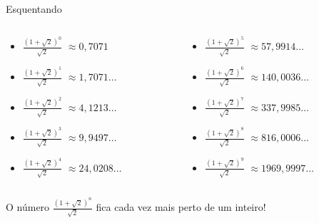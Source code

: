 \documentclass[aspectratio=169, handout]{beamer}
\begin{document}
\begin{frame}{Esquentando}{}
	\begin{columns}
		\begin{column}{5cm}
			\begin{itemize}
				\item $\frac{\left(1+\sqrt{2}\right)^0}{\sqrt{2}}$ \pause $\approx  0{,}7071$
				\item $\frac{\left(1+\sqrt{2}\right)^1}{\sqrt{2}}$ \pause $\approx  1{,}7071\dots$
				\item $\frac{\left(1+\sqrt{2}\right)^2}{\sqrt{2}}$ \pause $\approx  4{,}1213\dots$
				\item $\frac{\left(1+\sqrt{2}\right)^3}{\sqrt{2}}$ \pause $\approx  9{,}9497\dots$
				\item $\frac{\left(1+\sqrt{2}\right)^4}{\sqrt{2}}$ \pause $\approx 24{,}0208\dots$
			\end{itemize}
		\end{column}
		\begin{column}{6cm}
			\begin{itemize}
				\item $\frac{\left(1+\sqrt{2}\right)^5}{\sqrt{2}}$ \pause $\approx 57{,}9914\dots$
				\item $\frac{\left(1+\sqrt{2}\right)^6}{\sqrt{2}}$ \pause $\approx 140{,}0036\dots$
				\item $\frac{\left(1+\sqrt{2}\right)^7}{\sqrt{2}}$ \pause $\approx 337{,}9985\dots$
				\item $\frac{\left(1+\sqrt{2}\right)^8}{\sqrt{2}}$ \pause $\approx 816{,}0006\dots$
				\item $\frac{\left(1+\sqrt{2}\right)^9}{\sqrt{2}}$ \pause $\approx 1969{,}9997\dots$
			\end{itemize}
		\end{column}
	\end{columns}
	
	\vspace{1em}
	\pause O número $\frac{\left(1+\sqrt{2}\right)^n}{\sqrt{2}}$ fica cada vez mais perto de um inteiro!
\end{frame}
\end{document}
